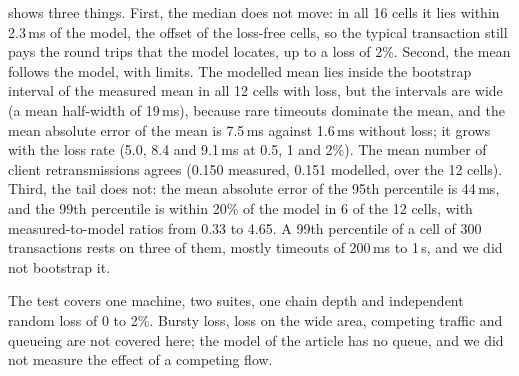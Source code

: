 \documentclass[preprint,12pt]{elsarticle}
\newcommand{\ms}{\,ms\xspace}
\begin{document}
 shows three things. First, the median does not move: in all 16 cells it lies within 2.3\ms of the model, the offset of the loss-free cells, so the typical transaction still pays the round trips that the model locates, up to a loss of 2\%. Second, the mean follows the model, with limits. The modelled mean lies inside the bootstrap interval of the measured mean in all 12 cells with loss, but the intervals are wide (a mean half-width of 19\ms), because rare timeouts dominate the mean, and the mean absolute error of the mean is 7.5\ms against 1.6\ms without loss; it grows with the loss rate (5.0, 8.4 and 9.1\ms at 0.5, 1 and 2\%). The mean number of client retransmissions agrees (0.150 measured, 0.151 modelled, over the 12 cells). Third, the tail does not: the mean absolute error of the 95th percentile is 44\ms, and the 99th percentile is within 20\% of the model in 6 of the 12 cells, with measured-to-model ratios from 0.33 to 4.65. A 99th percentile of a cell of 300 transactions rests on three of them, mostly timeouts of 200\ms to 1\,s, and we did not bootstrap it.

The test covers one machine, two suites, one chain depth and independent random loss of 0 to 2\%. Bursty loss, loss on the wide area, competing traffic and queueing are not covered here; the model of the article has no queue, and we did not measure the effect of a competing flow.

\FloatBarrier
\end{document}
